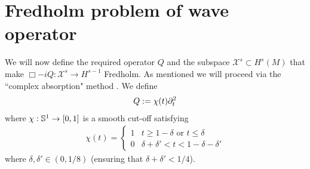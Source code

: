 \documentclass[12pt]{article}
\begin{document}
\pagebreak
\section{Fredholm problem of wave operator} 
We will now define the required operator $Q$ and the subspace $\mathcal{X}^s \subset H^{s}(M)$ that make $\Box - iQ: \mathcal{X}^s \to H^{s -1}$ Fredholm.  As mentioned we will proceed via the ``complex absorption" method \cite{Vasy2015-oo}. We define
\begin{align*}
Q := \chi(t) \p_t^2
\end{align*}
where $\chi : \S^1 \to [0, 1]$ is a smooth cut-off satisfying
\begin{align*}
\chi(t) = 
\begin{cases}
1 & t \geq  1 - \delta \text{ or } t \leq \delta \\
0 &  \delta + \delta' < t < 1 - \delta - \delta'
\end{cases}
\end{align*}
where $\delta, \delta' \in (0, 1/8)$ (ensuring that $\delta+ \delta' < 1/4$). 
\end{document}
